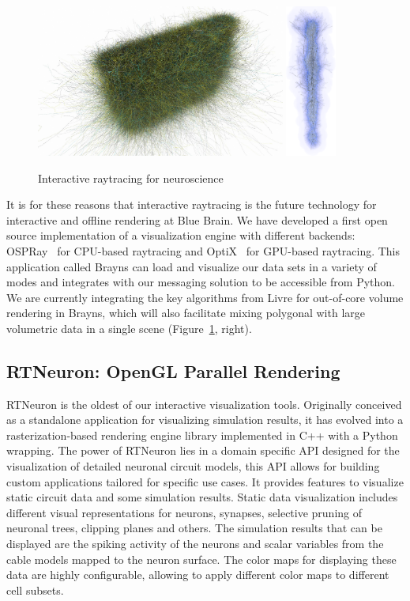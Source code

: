 \documentclass[10pt]{llncs}
\newcommand{\fig}[1]{Figure~\ref{#1}}
\begin{document}
\begin{figure}[ht]\center
  \includegraphics[height=5cm]{images/Brayns003}\hfil
  \includegraphics[height=5cm]{images/Brayns001}
  \caption{\label{fBrayns}Interactive raytracing for neuroscience}
\end{figure}

It is for these reasons that interactive raytracing is the future technology for
interactive and offline rendering at Blue Brain. We have developed a first open
source implementation of a visualization engine with different backends:
OSPRay~\cite{ospray} for CPU-based raytracing and OptiX~\cite{optix} for
GPU-based raytracing. This application called Brayns can load and visualize our
data sets in a variety of modes and integrates with our messaging solution to be
accessible from Python. We are currently integrating the key algorithms from
Livre for out-of-core volume rendering in Brayns, which will also facilitate
mixing polygonal with large volumetric data in a single scene (\fig{fBrayns},
right).

\subsection{RTNeuron: OpenGL Parallel Rendering}

RTNeuron\cite{HBBES:13} is the oldest of our interactive visualization tools.
Originally conceived as a standalone application for visualizing simulation
results, it has evolved into a rasterization-based rendering engine library
implemented in C++ with a Python wrapping. The power of RTNeuron lies in a
domain specific API designed for the visualization of detailed neuronal circuit
models, this API allows for building custom applications tailored for specific
use cases. It provides features to visualize static circuit data and some
simulation results. Static data visualization includes different visual
representations for neurons, synapses, selective pruning of neuronal trees,
clipping planes and others. The simulation results that can be displayed are the
spiking activity of the neurons and scalar variables from the cable models
mapped to the neuron surface. The color maps for displaying these data are
highly configurable, allowing to apply different color maps to different cell
subsets.
\end{document}
